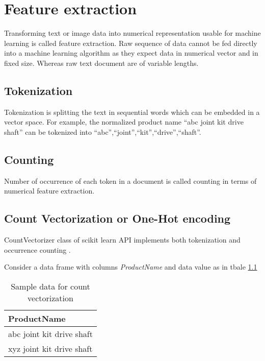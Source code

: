\chapter{Feature extraction} \label{ch:feature-extraction}

Transforming text or image data into numerical representation usable for machine learning is called feature extraction. Raw sequence of data cannot be fed directly into a machine learning algorithm as they expect data in numerical vector and in fixed size. Whereas raw text document are of variable lengths. 

\section{Tokenization}

Tokenization is splitting the text in sequential words which can be embedded in a vector space.
For example, the normalized product name ``abc joint kit drive shaft'' can be tokenized into  ``abc'',``joint'',``kit'',``drive'',``shaft''. 



\section{Counting}

Number of occurrence of each token in a document is called counting in terms of numerical feature extraction.

\section{Count Vectorization or One-Hot encoding} \label{ch_countvector}


CountVectorizer class of scikit learn API implements both tokenization and occurrence counting \parencite{sklearn_api}. 

Consider a data frame with columns \textit{ProductName} and data value as in tbale \ref{table:count_vectorization}

\begin{table}[h]
    \centering
    \caption{Sample data for count vectorization}
    \label{table:count_vectorization}
    \begin{tabular}{ l }
          \toprule
          
          \textbf{ProductName}\\
          \midrule
          abc joint kit drive shaft\\
          xyz joint kit drive shaft\\
         
          \bottomrule
          \end{tabular}
\end{table}

